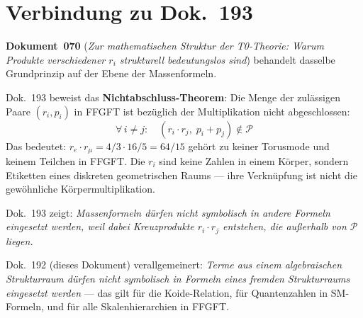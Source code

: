 \begin{center}
\end{center}


\section*{Verbindung zu Dok.~193}

\textbf{Dokument~070} (\textit{Zur mathematischen Struktur der T0-Theorie:
Warum Produkte verschiedener $r_i$ strukturell bedeutungslos sind})
behandelt dasselbe Grundprinzip auf der Ebene der Massenformeln.

Dok.~193 beweist das \textbf{Nichtabschluss-Theorem}: Die Menge der
zulässigen Paare $(r_i, p_i)$ in FFGFT ist bezüglich der Multiplikation
nicht abgeschlossen:
\[
  \forall\, i \neq j:\quad (r_i \cdot r_j,\; p_i + p_j) \notin \mathcal{P}
\]
Das bedeutet: $r_e \cdot r_\mu = 4/3 \cdot 16/5 = 64/15$ gehört zu
keiner Torusmode und keinem Teilchen in FFGFT.
Die $r_i$ sind keine Zahlen in einem Körper, sondern Etiketten eines
diskreten geometrischen Raums --- ihre Verknüpfung ist nicht die
gewöhnliche Körpermultiplikation.

Dok.~193 zeigt: \emph{Massenformeln dürfen nicht symbolisch in andere
Formeln eingesetzt werden, weil dabei Kreuzprodukte $r_i \cdot r_j$
entstehen, die außerhalb von $\mathcal{P}$ liegen.}

Dok.~192 (dieses Dokument) verallgemeinert: \emph{Terme aus einem
algebraischen Strukturraum dürfen nicht symbolisch in Formeln eines
fremden Strukturraums eingesetzt werden} --- das gilt für die
Koide-Relation, für Quantenzahlen in SM-Formeln, und für alle
Skalenhierarchien in FFGFT.

